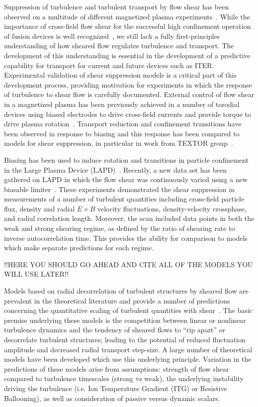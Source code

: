 \documentclass[aip,pop,amsmath,amssymb,preprint,superscriptaddress]{revtex4-1} %
\begin{document}
Suppression of turbulence and turbulent transport by flow shear has been observed on a multitude of different magnetized plasma experiments~\cite{burrell97,burrell99,terry00,oost03,sakai93,schaffner12}. While the importance of cross-field flow shear for the successful high confinement operation of fusion devices is well recognized~\cite{burrel92}, we still lack a fully first-principles understanding of how sheared flow regulates turbulence and transport.  The development of this understanding is essential in the development of a predictive capability for transport for current and future devices such as ITER. Experimental validation of shear suppression models is a critical part of this development process, providing motivation for experiments in which the response of turbulence to shear flow is carefully documented.  External control of flow shear in a magnetized plasma has been previously achieved in a number of torodial devices using biased electrodes to drive cross-field currents and provide torque to drive plasma rotation~\cite{taylor89,weynants92}.   Transport reduction and confinement transitions have been observed in response to biasing and this response has been compared to models for shear suppression, in particular in work from TEXTOR group~\cite{weynants98,boedo00,boedo02}.

Biasing has been used to induce rotation and transitions in particle confinement in the Large Plasma Device (LAPD)~\cite{maggs07,carter09}. Recently, a new data set has been gathered on LAPD in which the flow shear was continuously varied using a new biasable limiter~\cite{schaffner12}. These experiments demonstrated the shear suppression in measurements of a number of turbulent quantities including cross-field particle flux, density and radial $E\times B$ velocity fluctuations, density-velocity crossphase, and radial correlation length. Moreover, the scan included data points in both the weak and strong shearing regime, as defined by the ratio of shearing rate to inverse autocorrelation time.  This provides the ability for comparison to models which make separate predictions for each regime.

!!HERE YOU SHOULD GO AHEAD AND CITE ALL OF THE MODELS YOU WILL USE LATER!!

Models based on radial decorrelation of turbulent structures by sheared flow are prevalent in the theoretical literature and provide a number of predictions concerning the quantitative scaling of turbulent quantities with shear~\cite{terry00}. The basic premise underlying these models is the competition between linear or nonlinear turbulence dynamics and the tendency of sheared flows to ``rip apart'' or decorrelate turbulent structures; leading to the potential of reduced fluctuation amplitude and decreased radial transport step-size. A large number of theoretical models have been developed which use this underlying principle. Variation in the predictions of these models arise from assumptions: strength of flow shear compared to turbulence timescales (strong vs weak), the underlying instability driving the turbulence (i.e. Ion Temperature Gradient (ITG) or Resistive Ballooning), as well as consideration of passive versus dynamic scalars. 
\end{document}
